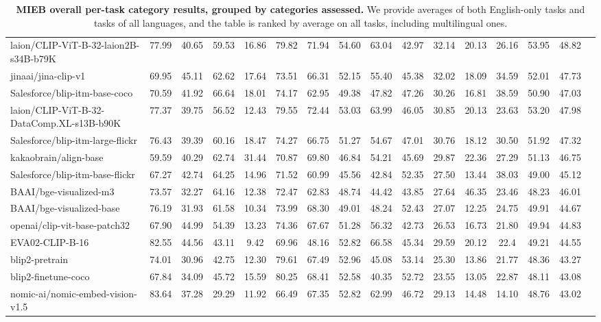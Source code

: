 \begin{table*}[!htp]
{\begin{tabular}{lcccccccccc|cc|ccc}
laion/CLIP-ViT-B-32-laion2B-s34B-b79K &77.99 &40.65 &59.53 &16.86 &79.82 &71.94 &54.60 &63.04 &42.97 &32.14 &20.13 &26.16 &53.95 &48.82 \\
jinaai/jina-clip-v1 &69.95 &45.11 &62.62 &17.64 &73.51 &66.31 &52.15 &55.40 &45.38 &32.02 &18.09 &34.59 &52.01 &47.73 \\
Salesforce/blip-itm-base-coco &70.59 &41.92 &66.64 &18.01 &74.17 &62.95 &49.38 &47.82 &47.26 &30.26 &16.81 &38.59 &50.90 &47.03 \\
laion/CLIP-ViT-B-32-DataComp.XL-s13B-b90K &77.37 &39.75 &56.52 &12.43 &79.55 &72.44 &53.03 &63.99 &46.05 &30.85 &20.13 &23.63 &53.20 &47.98 \\
Salesforce/blip-itm-large-flickr &76.43 &39.39 &60.16 &18.47 &74.27 &66.75 &51.27 &54.67 &47.01 &30.76 &18.12 &30.50 &51.92 &47.32 \\
kakaobrain/align-base &59.59 &40.29 &62.74 &31.44 &70.87 &69.80 &46.84 &54.21 &45.69 &29.87 &22.36 &27.29 &51.13 &46.75 \\
Salesforce/blip-itm-base-flickr &67.27 &42.74 &64.25 &14.96 &71.52 &60.99 &45.56 &42.84 &52.35 &27.50 &13.44 &38.03 &49.00 &45.12 \\
BAAI/bge-visualized-m3 &73.57 &32.27 &64.16 &12.38 &72.47 &62.83 &48.74 &44.42 &43.85 &27.64 &46.35 &23.46 &48.23 &46.01 \\
BAAI/bge-visualized-base &76.19 &31.93 &61.58 &10.34 &73.99 &68.30 &49.01 &48.24 &52.43 &27.07 &12.25 &24.75 &49.91 &44.67 \\
openai/clip-vit-base-patch32 &67.90 &44.99 &54.39 &13.23 &74.36 &67.67 &51.28 &56.32 &42.73 &26.53 &16.73 &21.80 &49.94 &44.83 \\
EVA02-CLIP-B-16 &82.55 &44.56 &43.11 &9.42 &69.96 &48.16 &52.82 &66.58 &45.34 &29.59 &20.12 &22.4 &49.21 &44.55 \\
blip2-pretrain &74.01 &30.96 &42.75 &12.30 &79.61 &67.49 &52.96 &45.08 &53.14 &25.30 &13.86 &21.77 &48.36 &43.27 \\
blip2-finetune-coco &67.84 &34.09 &45.72 &15.59 &80.25 &68.41 &52.58 &40.35 &52.72 &23.55 &13.05 &22.87 &48.11 &43.08 \\
nomic-ai/nomic-embed-vision-v1.5 &83.64 &37.28 &29.29 &11.92 &66.49 &67.35 &52.82 &62.99 &46.72 &29.13 &14.48 &14.10 &48.76 &43.02 \\
\bottomrule
\end{tabular}}
\caption{\textbf{MIEB overall per-task category results, grouped by categories assessed.} We provide averages of both English-only tasks and tasks of all languages, and the table is ranked by average on all tasks, including multilingual ones.}\label{tab: overall results full.}
\end{table*}